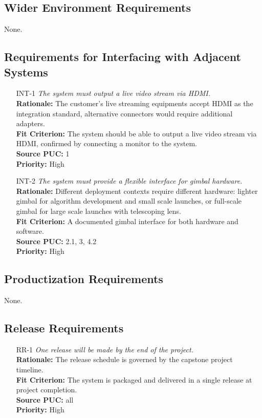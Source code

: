 \documentclass[12pt]{article}
\begin{document}
\subsection{Wider Environment Requirements}

None.

\subsection{Requirements for Interfacing with Adjacent Systems}

\begin{itemize}[leftmargin=*]
  \item[INT-1] \emph{The system must output a live video stream via HDMI.}\\[2mm]
        \textbf{Rationale:} The customer's live streaming equipments accept HDMI as the integration standard, alternative connectors would require additional adapters.\\
        \textbf{Fit Criterion:} The system should be able to output a live video stream via HDMI, confirmed by connecting a monitor to the system.\\
        \textbf{Source PUC:} 1 \\
        \textbf{Priority:} High

  \item[INT-2] \emph{The system must provide a flexible interface for gimbal
          hardware.}\\[2mm]
        \textbf{Rationale:} Different deployment contexts require different hardware: lighter gimbal for algorithm development and small scale launches, or full-scale gimbal for large scale launches with telescoping lens.\\
        \textbf{Fit Criterion:} A documented gimbal interface for both hardware and software.\\
        \textbf{Source PUC:} 2.1, 3, 4.2 \\
        \textbf{Priority:} High
\end{itemize}

\subsection{Productization Requirements}

None.

\subsection{Release Requirements}
\begin{itemize}[leftmargin=*]
  \item[RR-1] \emph{One release will be made by the end of the project.}\\[2mm]
        \textbf{Rationale:} The release schedule is governed by the capstone project timeline.\\
        \textbf{Fit Criterion:} The system is packaged and delivered in a single release at project completion.\\
        \textbf{Source PUC:} all \\
        \textbf{Priority:} High
\end{itemize}
\end{document}
